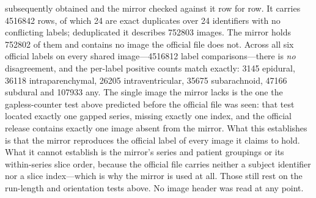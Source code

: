 \documentclass[11pt,letterpaper]{article}
\begin{document}
\begin{singlespace}
{subsequently obtained and the mirror checked against it row for row. It carries
\num{4516842} rows, of which 24 are exact duplicates over 24 identifiers with no
conflicting labels; deduplicated it describes \num{752803} images. The mirror
holds \num{752802} of them and contains no image the official file does not.
Across all six official labels on every shared image---\num{4516812} label
comparisons---there is \emph{no} disagreement, and the per-label positive counts
match exactly: \num{3145} epidural, \num{36118} intraparenchymal, \num{26205}
intraventricular, \num{35675} subarachnoid, \num{47166} subdural and
\num{107933} any. The single image the mirror lacks is the one the gapless-counter
test above predicted before the official file was seen: that test located exactly
one gapped series, missing exactly one index, and the official release contains
exactly one image absent from the mirror. What this establishes is that the
mirror reproduces the official label of every image it claims to hold. What it
cannot establish is the mirror's series and patient groupings or its within-series
slice order, because the official file carries neither a subject identifier nor a
slice index---which is why the mirror is used at all. Those still rest on the
run-length and orientation tests above. No image header was read at any point.

}

\end{singlespace}
\end{document}
